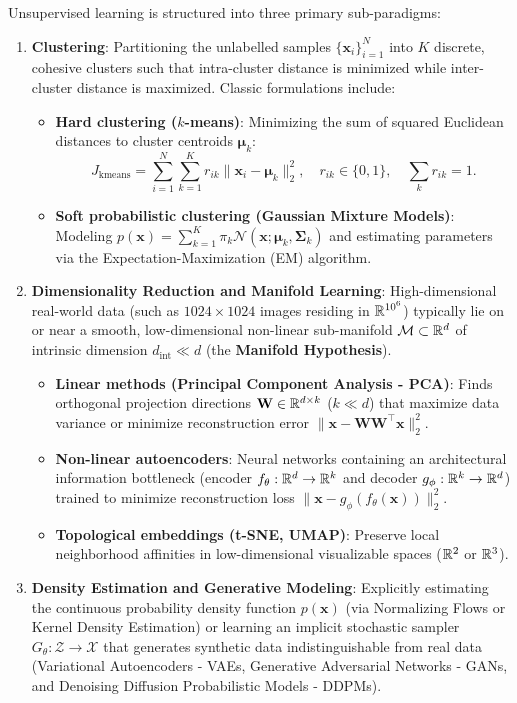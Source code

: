 Unsupervised learning is structured into three primary sub-paradigms:
\begin{enumerate}
  \item \textbf{Clustering}:
  Partitioning the unlabelled samples $\{\mathbf{x}_i\}_{i=1}^N$ into $K$ discrete, cohesive clusters such that intra-cluster distance is minimized while inter-cluster distance is maximized. Classic formulations include:
  \begin{itemize}[noitemsep]
    \item \textbf{Hard clustering ($k$-means)}: Minimizing the sum of squared Euclidean distances to cluster centroids $\boldsymbol{\mu}_k$:
    \begin{equation}
    J_{\text{kmeans}} = \sum_{i=1}^N \sum_{k=1}^K r_{ik} \|\mathbf{x}_i - \boldsymbol{\mu}_k\|_2^2, \quad r_{ik} \in \{0, 1\}, \quad \sum_k r_{ik} = 1.
    \end{equation}
    \item \textbf{Soft probabilistic clustering (Gaussian Mixture Models)}: Modeling $p(\mathbf{x}) = \sum_{k=1}^K \pi_k \mathcal{N}(\mathbf{x}; \boldsymbol{\mu}_k, \boldsymbol{\Sigma}_k)$ and estimating parameters via the Expectation-Maximization (EM) algorithm.
  \end{itemize}

  \item \textbf{Dimensionality Reduction and Manifold Learning}:
  High-dimensional real-world data (such as $1024 \times 1024$ images residing in $\mathbb{R}^{10^6}$) typically lie on or near a smooth, low-dimensional non-linear sub-manifold $\mathcal{M} \subset \mathbb{R}^d$ of intrinsic dimension $d_{\text{int}} \ll d$ (the \textbf{Manifold Hypothesis}).
  \begin{itemize}[noitemsep]
    \item \textbf{Linear methods (Principal Component Analysis - PCA)}: Finds orthogonal projection directions $\mathbf{W} \in \mathbb{R}^{d \times k}$ ($k \ll d$) that maximize data variance or minimize reconstruction error $\|\mathbf{x} - \mathbf{W}\mathbf{W}^\top \mathbf{x}\|_2^2$.
    \item \textbf{Non-linear autoencoders}: Neural networks containing an architectural information bottleneck (encoder $f_\theta: \mathbb{R}^d \to \mathbb{R}^k$ and decoder $g_\phi: \mathbb{R}^k \to \mathbb{R}^d$) trained to minimize reconstruction loss $\|\mathbf{x} - g_\phi(f_\theta(\mathbf{x}))\|_2^2$.
    \item \textbf{Topological embeddings (t-SNE, UMAP)}: Preserve local neighborhood affinities in low-dimensional visualizable spaces ($\mathbb{R}^2$ or $\mathbb{R}^3$).
  \end{itemize}

  \item \textbf{Density Estimation and Generative Modeling}:
  Explicitly estimating the continuous probability density function $p(\mathbf{x})$ (via Normalizing Flows or Kernel Density Estimation) or learning an implicit stochastic sampler $G_\theta: \mathcal{Z} \to \mathcal{X}$ that generates synthetic data indistinguishable from real data (Variational Autoencoders - VAEs, Generative Adversarial Networks - GANs, and Denoising Diffusion Probabilistic Models - DDPMs).
\end{enumerate}

